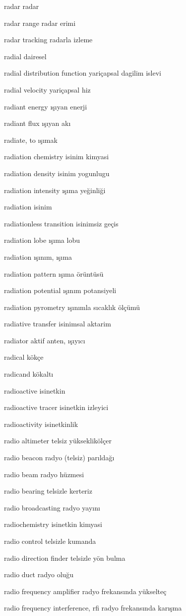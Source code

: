\documentclass[12pt,fleqn]{article}\usepackage{../../common}
\begin{document}
radar radar

radar range radar erimi

radar tracking radarla izleme

radial dairesel

radial distribution function yariçapsal dagilim islevi

radial velocity yariçapsal hiz

radiant energy ışıyan enerji

radiant flux ışıyan akı

radiate, to ışımak

radiation chemistry isinim kimyasi

radiation density isinim yogunlugu

radiation intensity ışıma yeğinliği

radiation isinim

radiationless transition isinimsiz geçis

radiation lobe ışıma lobu

radiation ışınım, ışıma

radiation pattern ışıma örüntüsü

radiation potential ışınım potansiyeli

radiation pyrometry ışınımla sıcaklık ölçümü

radiative transfer isinimsal aktarim

radiator aktif anten, ışıyıcı

radical kökçe

radicand kökaltı

radioactive isinetkin

radioactive tracer isinetkin izleyici

radioactivity isinetkinlik

radio altimeter telsiz yükseklikölçer

radio beacon radyo (telsiz) parıldağı

radio beam radyo hüzmesi

radio bearing telsizle kerteriz

radio broadcasting radyo yayını

radiochemistry isinetkin kimyasi

radio control telsizle kumanda

radio direction finder telsizle yön bulma

radio duct radyo oluğu

radio frequency amplifier radyo frekansında yükselteç

radio frequency interference, rfi radyo frekansında karışma
\end{document}
